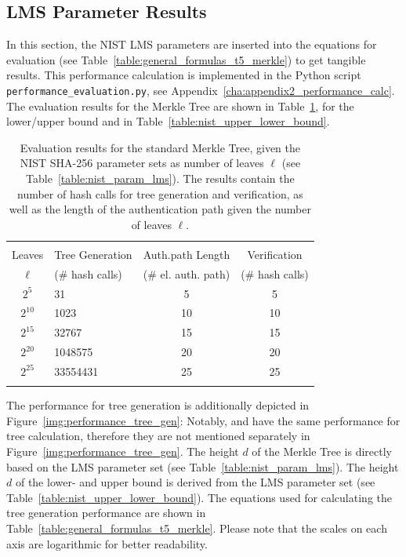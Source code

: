 \subsection{LMS Parameter Results}
In this section, the NIST LMS parameters are inserted into the equations for evaluation (see Table~\ref{table:general_formulas_t5_merkle}) to get tangible results. 
This performance calculation is implemented in the Python script \texttt{performance_evaluation.py}, see Appendix~\ref{cha:appendix2_performance_calc}.
The evaluation results for the Merkle Tree are shown in Table~\ref{table:eval_merkle_tree_NIST}, for the lower/upper bound \tftree and \extree in Table~\ref{table:nist_upper_lower_bound}.

\begin{table}
\centering
\begin{tabular}{c l c c} 
 \hline\noalign{\smallskip}
 \multicolumn{4}{c}{\textbf{Evaluation Results NIST: Merkle Tree}} \\
 \noalign{\smallskip} 
  Leaves & Tree Generation & Auth.path Length & Verification \\
   \noalign{\smallskip} 
  $\ell$ & (\# hash calls) & (\# el. auth. path) & (\# hash calls) \\
 \hline\noalign{\smallskip}
 $2^5$ & 31 & 5 & 5 \\
 $2^{10}$ & 1023 & 10 & 10 \\
 $2^{15}$ & 32767 & 15 & 15 \\ 
 $2^{20}$ & 1048575 & 20 & 20 \\ 
 $2^{25}$ & 33554431 & 25 & 25 \\ 
 \hline\noalign{\smallskip}
 \end{tabular}
\caption{Evaluation results for the standard Merkle Tree, given the NIST SHA-256 parameter sets as number of leaves $\ell$ (see Table~\ref{table:nist_param_lms}). The results contain the number of hash calls for tree generation and verification, as well as the length of the authentication path given the number of leaves $\ell$.}
\label{table:eval_merkle_tree_NIST}
\end{table}
The performance for tree generation is additionally depicted in Figure~\ref{img:performance_tree_gen}: Notably, \tftree and \extree have the same performance for tree calculation, therefore they are not mentioned separately in Figure~\ref{img:performance_tree_gen}. The height $d$ of the Merkle Tree is directly based on the LMS parameter set (see Table~\ref{table:nist_param_lms}). The height $d$ of the lower- and upper bound \tftree is derived from the LMS parameter set (see Table~\ref{table:nist_upper_lower_bound}). The equations used for calculating the tree generation performance are shown in Table~\ref{table:general_formulas_t5_merkle}. Please note that the scales on each axis are logarithmic for better readability.

